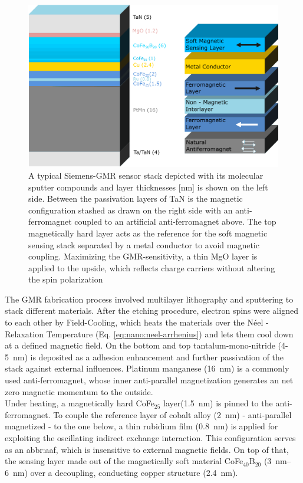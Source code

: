 \begin{figure}[h]
	\centering
	\includegraphics[scale=.5]{Ressourcen/IMG/GMR-Stack-with-text}
	\caption{A typical Siemens-GMR sensor stack depicted with its molecular sputter compounds and layer thicknesses [nm] is shown on the left side. Between the passivation layers of TaN is the magnetic configuration stashed as drawn on the right side with an anti-ferromagnet coupled to an artificial anti-ferromagnet above. The top magnetically hard layer acts as the reference for the soft magnetic sensing stack separated by a metal conductor to avoid magnetic coupling. Maximizing the GMR-sensitivity, a thin MgO layer is applied to the upside, which reflects charge carriers without altering the spin polarization \cite{lit:Helou}}
	\label{fig:nano:gmr-stack}
\end{figure}

The GMR fabrication process involved multilayer lithography and sputtering to stack different materials. After the etching procedure, electron spins were aligned to each other by Field-Cooling, which heats the materials over the N\'{e}el - Relaxation Temperature (Eq. \ref{eq:nano:neel-arrhenius}) and lets them cool down at a defined magnetic field. On the bottom and top tantalum-mono-nitride (4-\SI{5}{\nano\meter}) is deposited as a adhesion enhancement and further passivation of the stack against external influences. Platinum manganese (\SI{16}{\nano\meter}) is a commonly used anti-ferromagnet, whose inner anti-parallel magnetization generates an net zero magnetic momentum to the outside.\\
Under heating, a magnetically hard CoFe$_{25}$ layer(\SI{1.5}{\nano\meter}) is pinned to the anti-ferromagnet. To couple the reference layer of cobalt alloy (\SI{2}{\nano\meter}) - anti-parallel magnetized - to the one below, a thin rubidium film (\SI{0.8}{\nano\meter}) is applied for exploiting the oscillating indirect exchange interaction. This configuration serves as an \acrshort{abbr:aaf}, which is insensitive to external magnetic fields. On top of that, the sensing layer made out of the magnetically soft material CoFe$_{40}$B$_{20}$ (\SIrange{3}{6}{\nano\meter}) over a decoupling, conducting copper structure (\SI{2.4}{\nano\meter}).

